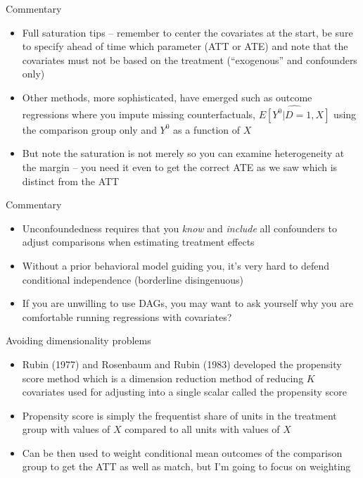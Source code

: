 \documentclass{beamer}
\begin{document}
\begin{frame}{Commentary}

\begin{itemize}
\item Full saturation tips -- remember to center the covariates at the start, be sure to specify ahead of time which parameter (ATT or ATE) and note that the covariates must not be based on the treatment (``exogenous'' and confounders only)
\item Other methods, more sophisticated, have emerged such as outcome regressions where you impute missing counterfactuals, $\widehat{E[Y^0|D=1,X]}$ using the comparison group only and $Y^0$ as a function of $X$ 
\item But note the saturation is not merely so you can examine heterogeneity at the margin -- you need it even to get the correct ATE as we saw which is distinct from the ATT
\end{itemize}

\end{frame}




\begin{frame}{Commentary}

\begin{itemize}

\item Unconfoundedness requires that you \emph{know} and \emph{include} all confounders to adjust comparisons when estimating treatment effects
\item Without a prior behavioral model guiding you, it's very hard to defend conditional independence (borderline disingenuous) 
\item If you are unwilling to use DAGs, you may want to ask yourself why you are comfortable running regressions with covariates?

\end{itemize}

\end{frame}

\begin{frame}{Avoiding dimensionality problems}
	
	\begin{itemize}
	\item Rubin (1977) and Rosenbaum and Rubin (1983) developed the propensity score method which is a dimension reduction method of reducing $K$ covariates used for adjusting into a single scalar called the propensity score
	\item Propensity score is simply the frequentist share of units in the treatment group with values of $X$ compared to all units with values of $X$
	\item Can be then used to weight conditional mean outcomes of the comparison group to get the ATT as well as match, but I'm going to focus on weighting
	\end{itemize}
	
\end{frame}
\end{document}
